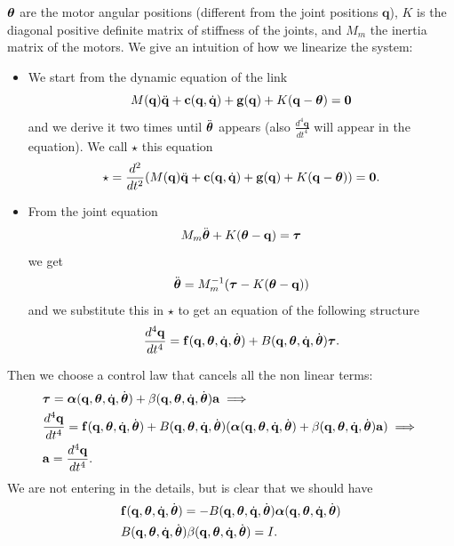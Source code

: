 \documentclass[10pt, a4paper]{report}
\newcommand{\q}{{\mathbf q}}
\begin{document}
${\boldsymbol{\theta}}$ are the motor angular positions (different from the joint positions $\q$), $K$ is the diagonal positive definite matrix of  stiffness of the joints, and $M_m$ the inertia matrix of the motors. We give an intuition of how we linearize the system:\begin{itemize}
    \item We start from the dynamic equation of the link
    $$M(\q)\ddq+\mathbf c(\q,\dq)+\mathbf g(\q)+K(\q-\btheta)=\mathbf 0$$
    and we derive it two times until $\ddot{{\boldsymbol{\theta}}}$ appears (also $\frac{d^4\q}{dt^4}$ will appear in the equation). We call $\star$ this equation\begin{equation}
        \star = \frac{d^2}{dt^2}(M(\q)\ddq+\mathbf c(\q,\dq)+\mathbf g(\q)+K(\q-\btheta))=\mathbf 0.
    \end{equation}
    \item From the joint equation \begin{equation}
        M_m\ddot{\btheta}+K(\btheta-\q)=\btau
    \end{equation}
    we get \begin{eqnarray}
        \ddot{\btheta}=M_m^{-1}(\btau-K(\btheta-\q))
    \end{eqnarray}
    and we substitute this in $\star$ to get an equation of the following structure\begin{equation}
        \frac{d^4\q}{dt^4}=\mathbf f(\q,\btheta,\dq,\dot\btheta)+B(\q,\btheta,\dq,\dot\btheta)\btau.
    \end{equation}
\end{itemize}
Then we choose a control law that cancels all the non linear terms:\begin{align}
    &\btau=\boldsymbol{\alpha}(\q,\btheta,\dq,\dot\btheta)+\beta(\q,\btheta,\dq,\dot\btheta)\mathbf a\implies \\
    &\frac{d^4\q}{dt^4}=\mathbf f(\q,\btheta,\dq,\dot\btheta)+B(\q,\btheta,\dq,\dot\btheta)(\boldsymbol{\alpha}(\q,\btheta,\dq,\dot\btheta)+\beta(\q,\btheta,\dq,\dot\btheta)\mathbf a)\implies \\
    &\mathbf a = \frac{d^4\q}{dt^4}.
\end{align}
We are not entering in the details, but is clear that we should have\begin{align}
    &\mathbf f (\q,\btheta,\dq,\dot\btheta)=-B(\q,\btheta,\dq,\dot\btheta)\boldsymbol{\alpha}(\q,\btheta,\dq,\dot\btheta)\\ 
    &B (\q,\btheta,\dq,\dot\btheta)\beta (\q,\btheta,\dq,\dot\btheta)=I.
\end{align}
\end{document}
